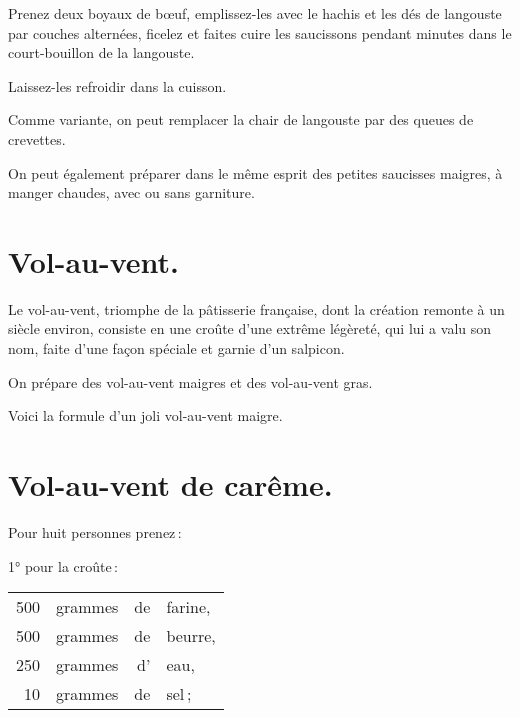 Prenez deux boyaux de bœuf, emplissez-les avec le hachis et les dés de
langouste par couches alternées, ficelez et faites cuire les saucissons pendant
{\mmm} minutes dans le court-bouillon de la langouste.

Laissez-les refroidir dans la cuisson.

\sk

Comme variante, on peut remplacer la chair de langouste par des queues de
crevettes.

\sk

On peut également préparer dans le même esprit des petites saucisses maigres,
à manger chaudes, avec ou sans garniture.

\section*{\centering Vol-au-vent.}

Le vol-au-vent, triomphe de la pâtisserie française, dont la création remonte
à un siècle environ, consiste en une croûte d'une extrême légèreté, qui lui
a valu son nom, faite d'une façon spéciale et garnie d'un salpicon.

On prépare des vol-au-vent maigres et des vol-au-vent gras.

Voici la formule d'un joli vol-au-vent maigre.

\section*{\centering Vol-au-vent de carême.}

\label{pg0319} \hypertarget{p0319}{}

Pour huit personnes prenez :

\medskip

1° pour la croûte :

\medskip

\footnotesize
\begin{longtable}{rrrp{16em}}
    500 & grammes & de & farine,                                                                          \\
    500 & grammes & de & beurre,                                                                          \\
    250 & grammes & d' & eau,                                                                             \\
     10 & grammes & de & sel ;                                                                            \\
\end{longtable}
\normalsize

